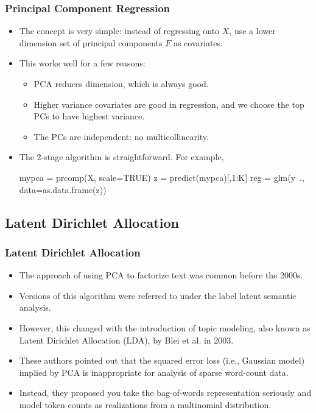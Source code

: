 \documentclass[
  shownotes,
  xcolor={svgnames},
  hyperref={colorlinks,citecolor=DarkBlue,linkcolor=DarkRed,urlcolor=DarkBlue}
  , aspectratio=169]{beamer}
\newcommand{\nv}{\color{Navy}}
\begin{document}
\begin{frame}[fragile]
\frametitle{Principal Component Regression}


\begin{itemize}




\item The concept is very simple: instead of regressing onto $X$, use a lower dimension set of principal components $F$ as covariates.

\medskip
\item This works well for a few reasons:
\begin{itemize}
\item PCA reduces dimension, which is always good.
\item Higher variance covariates are good in regression, and we choose
  the top PCs to have highest variance.
\item The PCs are independent: no multicollinearity.
\end{itemize}


\item The 2-stage algorithm is straightforward. For example,

{\nv 
\begin{semiverbatim}\vspace{.25cm}\small
         mypca = prcomp(X, scale=TRUE)
         z = predict(mypca)[,1:K]
         reg = glm(y~., data=as.data.frame(z))
\end{semiverbatim}
}

\end{itemize}


\end{frame}

\subsection{Latent Dirichlet Allocation}
\begin{frame}
\frametitle{Latent Dirichlet Allocation}

\begin{itemize}


\item The approach of using PCA to factorize text was common before the 2000s. 
\medskip
\item Versions of this algorithm were referred to under the label latent semantic analysis. 
\medskip
\item However, this changed with the introduction of topic modeling, also known as Latent Dirichlet Allocation (LDA), by Blei et al. in 2003. 
\medskip
\item These authors pointed out that the squared error loss (i.e., Gaussian model) implied by PCA is inappropriate for analysis of sparse word-count data. 
\medskip
\item Instead, they proposed you take the bag-of-words representation seriously and model token counts as realizations from a multinomial distribution. 
\end{itemize}

\end{frame}
\end{document}
